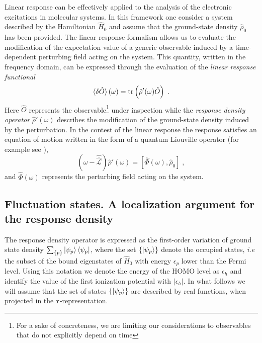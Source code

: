 \documentclass[reprint,aps,prb]{revtex4-1}
\renewcommand{\r}{{\bf r}}
\newcommand{\eps}{\epsilon}
\newcommand{\be}{\begin{equation}}
\newcommand{\ee}{\end{equation}}
\newcommand{\lb}{\label}
\newcommand{\op}[1]{\hat {#1}}
\newcommand{\sop}[1]{\op{\op {#1}}}
\newcommand{\commutator}[2]{\left[ {#1} , {#2} \right]}
\newcommand{\trace}[1]{\mathrm{tr}\left(#1\right)}
\newcommand{\dmnot}{\op{\rho}_0}
\newcommand{\dm}{\op{\rho}}
\newcommand{\hnot}{\op{H}_0}
\newcommand{\Liouv}{\sop{\mathcal L}}
\begin{document}
Linear response can be effectively applied to the analysis of the electronic excitations in molecular systems. In this framework one consider a system described by the Hamiltonian 
$\hnot$ and assume that the ground-state density $\dmnot$ has been provided. The linear response formalism allows us to evaluate the modification of the expectation value of a generic 
observable induced by a time-dependent perturbing field acting on the system. This quantity, written in the frequency domain, can be expressed through the evaluation of the 
\emph{linear response functional}
\be\lb{LinearResponseFunctDef1}
\braket{\delta\op O}(\omega) = \trace{\dm'(\omega)\op O} \;.
\ee
Here $\op O$ represents the observable\footnote{For a sake of concreteness, we are limiting our considerations to observables that do not explicitly depend on time} under inspection 
while the \emph{response density operator} $\dm'(\omega)$ describes the modification of the ground-state density induced by the perturbation. In the contest of the linear response 
the response satisfies an equation of motion written in the form of a quantum Liouville operator (for example see \cite{baroni2008}),
\be\lb{LiouvillianRhopomegaDef1}
\left(\omega - \Liouv\right) \dm'(\omega) =  \commutator{\op\Phi(\omega)}{\dmnot} \;,
\ee
and $\op\Phi(\omega)$ represents the perturbing field acting on the system. 

\subsection{Fluctuation states. A localization argument for the response density}

The response density operator is expressed as the first-order variation of ground state density $\sum_{\{p\}} \ket{\psi_p} \bra{\psi_p}$, where the set $\{\ket{\psi_p}\}$ denote the 
occupied states, \emph{i.e} the subset of the bound eigenstates of $\hnot$ with energy $\eps_p$ lower than the Fermi level. Using this notation we denote the energy of the HOMO level 
as $\eps_h$ and identify the value of the first ionization potential with $|\eps_h|$. In what follows we will assume that the set of states $\{\ket{\psi_p}\}$ are described by real 
functions, when projected in the $\r$-representation.  
\end{document}
